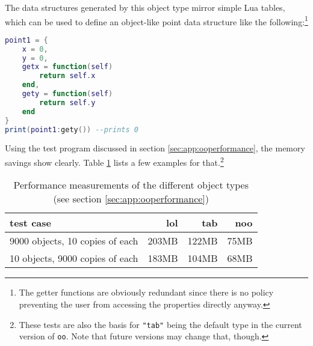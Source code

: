 The data structures generated by this object type mirror simple Lua tables, which can be used to define an object-like point data structure like the following:\footnote{The getter functions are obviously redundant since there is no policy preventing the user from accessing the properties directly anyway.}

\begin{lstlisting}[language=lua, caption={Possible implementation of a point using Lua's tables}, label=lst:noo, name=lst:noo]
point1 = {
	x = 0,
	y = 0,
	getx = function(self)
		return self.x
	end,
	gety = function(self)
		return self.y
	end
}
print(point1:gety()) --prints 0
\end{lstlisting}

Using the test program discussed in section \ref{sec:app:ooperformance}, the memory savings show clearly. Table \ref{tab:performance} lists a few examples for that.\footnote{These tests are also the basis for \texttt{"tab"} being the default type in the current version of \texttt{oo}. Note that future versions may change that, though.}

 \begin{table}[h]\centering
 \caption{Performance measurements of the different object types (see section \ref{sec:app:ooperformance})}
 \begin{tabular}{|l|rrr|}
\hline
test case & lol & tab & noo\\
\hline
\hline
9000 objects, 10 copies of each & 203MB & 122MB & 75MB \\
10 objects, 9000 copies of each & 183MB & 104MB & 68MB \\
\hline 
\end{tabular}
 \label{tab:performance}
 \end{table}


